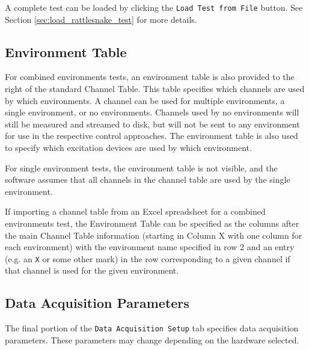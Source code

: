 \documentclass[pdf,12pt,report]{SANDreport}
\newcommand{\inlineCode}{\lstinline[basicstyle=\bfseries\ttfamily]}
\begin{document}
    A complete test can be loaded by clicking the \inlineCode{Load Test from File} button.  See Section \ref{sec:load_rattlesnake_test} for more details.

    \subsection{Environment Table}
    
    For combined environments tests, an environment table is also provided to the right of the standard Channel Table.  This table specifies which channels are used by which environments.  A channel can be used for multiple environments, a single environment, or no environments.  Channels used by no environments will still be measured and streamed to disk, but will not be sent to any environment for use in the respective control approaches.  The environment table is also used to specify which excitation devices are used by which environment.
    
    For single environment tests, the environment table is not visible, and the software assumes that all channels in the channel table are used by the single environment.
    
    If importing a channel table from an Excel spreadsheet for a combined environments test, the Environment Table can be specified as the columns after the main Channel Table information (starting in Column X with one column for each environment) with the environment name specified in row 2 and an entry (e.g. an \inlineCode{X} or some other mark) in the row corresponding to a given channel if that channel is used for the given environment.
    
    \subsection{Data Acquisition Parameters}
    The final portion of the \inlineCode{Data Acquisition Setup} tab specifies data acquisition parameters.  These parameters may change depending on the hardware selected.
    
\end{document}
